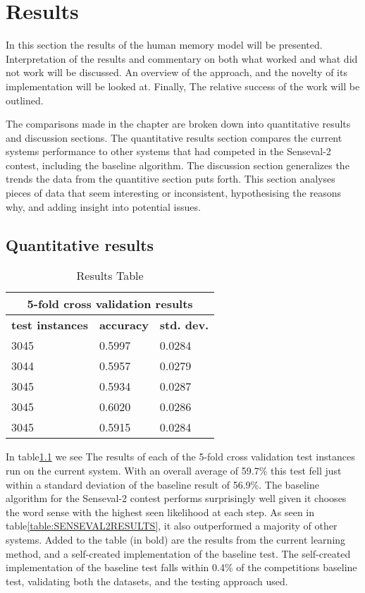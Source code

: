 \chapter{Results}

In this section the results of the human memory model will be presented.
Interpretation of the results and commentary on both what worked and what did
not work will be discussed. An overview of the approach, and the novelty of its
implementation will be looked at. Finally, The relative success of the work will
be outlined.

The comparisons made in the chapter are broken down into quantitative results
and discussion sections. The quantitative results section compares the current
systems performance to other systems that had competed in the Senseval-2
contest, including the baseline algorithm.  The discussion section generalizes
the trends the data from the quantitive section puts forth. This section
analyses pieces of data that seem interesting or inconsistent, hypothesising the
reasons why, and adding insight into potential issues.

\section{Quantitative results}

\begin{table}[htp]
	\begin{center}
		\begin{tabular}{|l|l|l|}
			\hline
				\multicolumn{3}{|c|}{\bf 5-fold cross validation results } \\
				\hline
				{\bf test instances} & {\bf accuracy} & {\bf std. dev.} \\ \hline 
				3045 & 0.5997 & 0.0284    \\ \hline 
				3044 & 0.5957 & 0.0279 \\ \hline 
				3045 & 0.5934 & 0.0287 \\ \hline 
				3045 & 0.6020 & 0.0286 \\ \hline 
				3045 & 0.5915 & 0.0284 \\ \hline
		\end{tabular}
		\caption{Results Table \label{table:RESULTS}}
	\end{center}
\end{table}

In table\ref{table:RESULTS} we see The results of each of the 5-fold cross
validation test instances run on the current system.  With an overall average of
59.7\% this test fell just within a standard deviation of the baseline result of
56.9\%. The baseline algorithm for the Senseval-2 contest performs surprisingly
well given it chooses the word sense with the highest seen likelihood at each
step.  As seen in table\ref{table:SENSEVAL2RESULTS}, it also outperformed a
majority of other systems. Added to the table (in bold) are the results from the
current learning method, and a self-created implementation of the baseline test.
The self-created implementation of the baseline test falls within 0.4\% of the
competitions baseline test, validating both the datasets, and the testing
approach used.

